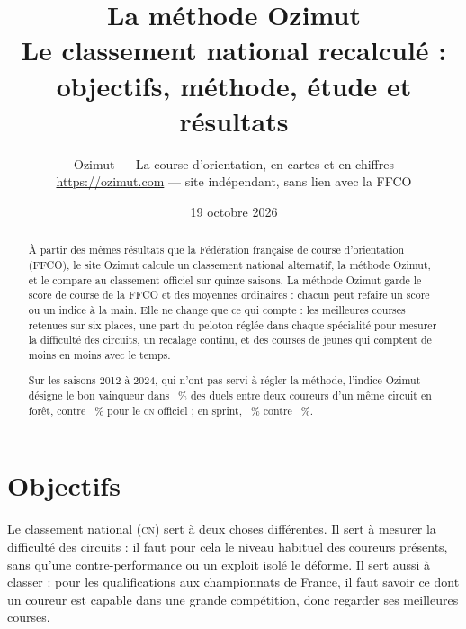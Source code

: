 \documentclass[11pt,a4paper]{article}
\title{La méthode Ozimut\\\large Le classement national recalculé : objectifs, méthode, étude et résultats}
\author{Ozimut — La course d'orientation, en cartes et en chiffres\\\small \url{https://ozimut.com} — site indépendant, sans lien avec la FFCO}
\date{19 octobre 2026}
\newcommand{\CN}{\textsc{cn}}
\begin{document}
\maketitle

\begin{abstract}
À partir des mêmes résultats que la Fédération française de course d'orientation (FFCO), le site Ozimut calcule un classement national alternatif, la méthode Ozimut, et le compare au classement officiel sur quinze saisons. La méthode Ozimut garde le score de course de la FFCO et des moyennes ordinaires : chacun peut refaire un score ou un indice à la main. Elle ne change que ce qui compte : les meilleures courses retenues sur six places, une part du peloton réglée dans chaque spécialité pour mesurer la difficulté des circuits, un recalage continu, et des courses de jeunes qui comptent de moins en moins avec le temps.

Sur les saisons 2012 à 2024, qui n'ont pas servi à régler la méthode, l'indice Ozimut désigne le bon vainqueur dans \NaccFtop~\% des duels entre deux coureurs d'un même circuit en forêt, contre \NaccFoff~\% pour le \CN{} officiel ; en sprint, \NaccStop~\% contre \NaccSoff~\%.
\end{abstract}

\tableofcontents

\section{Objectifs}

Le classement national (\CN) sert à deux choses différentes. Il sert à mesurer la difficulté des circuits : il faut pour cela le niveau habituel des coureurs présents, sans qu'une contre-performance ou un exploit isolé le déforme. Il sert aussi à classer : pour les qualifications aux championnats de France, il faut savoir ce dont un coureur est capable dans une grande compétition, donc regarder ses meilleures courses.
\end{document}
